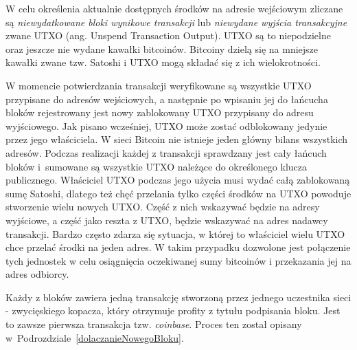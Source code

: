 \documentclass[12pt, oneside, final, openany]{mgr}
\begin{document}
\indent W celu określenia aktualnie dostępnych środków na adresie wejściowym zliczane są \textit{niewydatkowane bloki wynikowe transakcji} lub \textit{niewydane wyjścia transakcyjne} zwane UTXO (ang. Unspend Transaction Output). UTXO są to niepodzielne oraz jeszcze nie wydane kawałki bitcoinów. Bitcoiny dzielą się na mniejsze kawałki zwane tzw. Satoshi i UTXO mogą składać się z ich wielokrotności. 

\indent W momencie potwierdzania transakcji weryfikowane są wszystkie UTXO przypisane do adresów wejściowych, a następnie po wpisaniu jej do łańcucha bloków rejestrowany jest nowy zablokowany UTXO przypisany do adresu wyjściowego. Jak pisano wcześniej, UTXO może zostać odblokowany jedynie przez jego właściciela. W sieci Bitcoin nie istnieje jeden główny bilans wszystkich adresów. Podczas realizacji każdej z transakcji sprawdzany jest cały łańcuch bloków i~sumowane są wszystkie UTXO należące do określonego klucza publicznego. Właściciel UTXO podczas jego użycia musi wydać całą zablokowaną sumę Satoshi, dlatego też chęć przelania tylko części środków na UTXO powoduje stworzenie wielu nowych UTXO. Część z nich wskazywać będzie na adresy wyjściowe, a część jako reszta z UTXO, będzie wskazywać na adres nadawcy transakcji. Bardzo często zdarza się sytuacja, w której to właściciel wielu UTXO chce przelać środki na jeden adres. W takim przypadku dozwolone jest połączenie tych jednostek w celu osiągnięcia oczekiwanej sumy bitcoinów i przekazania jej na adres odbiorcy. 

\indent Każdy z bloków zawiera jedną transakcję stworzoną przez jednego uczestnika sieci - zwycięskiego kopacza, który otrzymuje profity z tytułu podpisania bloku. Jest to zawsze pierwsza transakcja tzw. \textit{coinbase}. Proces ten został opisany w~Podrozdziale~\ref{dolaczanieNowegoBloku}.
\end{document}

